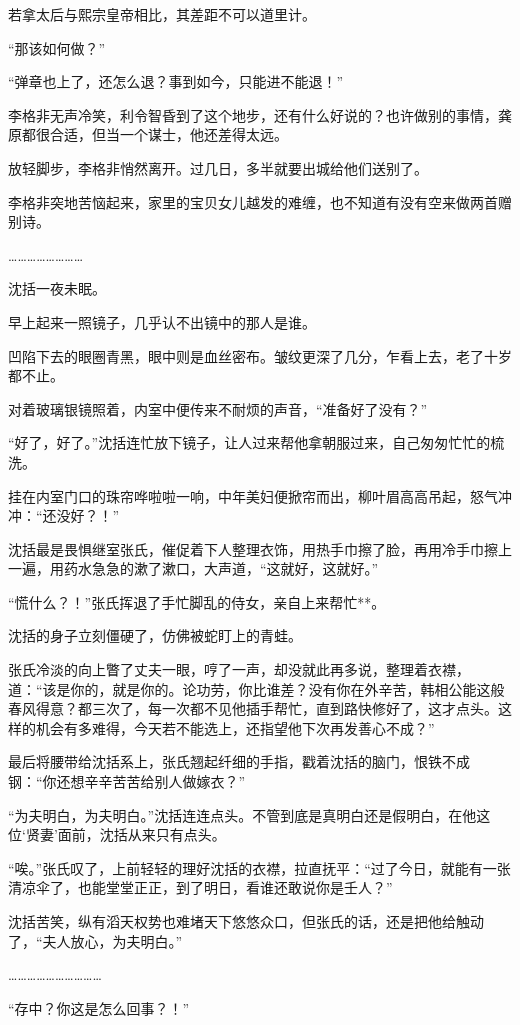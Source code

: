若拿太后与熙宗皇帝相比，其差距不可以道里计。

“那该如何做？”

“弹章也上了，还怎么退？事到如今，只能进不能退！”

李格非无声冷笑，利令智昏到了这个地步，还有什么好说的？也许做别的事情，龚原都很合适，但当一个谋士，他还差得太远。

放轻脚步，李格非悄然离开。过几日，多半就要出城给他们送别了。

李格非突地苦恼起来，家里的宝贝女儿越发的难缠，也不知道有没有空来做两首赠别诗。

……………………

沈括一夜未眠。

早上起来一照镜子，几乎认不出镜中的那人是谁。

凹陷下去的眼圈青黑，眼中则是血丝密布。皱纹更深了几分，乍看上去，老了十岁都不止。

对着玻璃银镜照着，内室中便传来不耐烦的声音，“准备好了没有？”

“好了，好了。”沈括连忙放下镜子，让人过来帮他拿朝服过来，自己匆匆忙忙的梳洗。

挂在内室门口的珠帘哗啦啦一响，中年美妇便掀帘而出，柳叶眉高高吊起，怒气冲冲：“还没好？！”

沈括最是畏惧继室张氏，催促着下人整理衣饰，用热手巾擦了脸，再用冷手巾擦上一遍，用药水急急的漱了漱口，大声道，“这就好，这就好。”

“慌什么？！”张氏挥退了手忙脚乱的侍女，亲自上来帮忙**。

沈括的身子立刻僵硬了，仿佛被蛇盯上的青蛙。

张氏冷淡的向上瞥了丈夫一眼，哼了一声，却没就此再多说，整理着衣襟，道：“该是你的，就是你的。论功劳，你比谁差？没有你在外辛苦，韩相公能这般春风得意？都三次了，每一次都不见他插手帮忙，直到路快修好了，这才点头。这样的机会有多难得，今天若不能选上，还指望他下次再发善心不成？”

最后将腰带给沈括系上，张氏翘起纤细的手指，戳着沈括的脑门，恨铁不成钢：“你还想辛辛苦苦给别人做嫁衣？”

“为夫明白，为夫明白。”沈括连连点头。不管到底是真明白还是假明白，在他这位‘贤妻’面前，沈括从来只有点头。

“唉。”张氏叹了，上前轻轻的理好沈括的衣襟，拉直抚平：“过了今日，就能有一张清凉伞了，也能堂堂正正，到了明日，看谁还敢说你是壬人？”

沈括苦笑，纵有滔天权势也难堵天下悠悠众口，但张氏的话，还是把他给触动了，“夫人放心，为夫明白。”

…………………………

“存中？你这是怎么回事？！”

